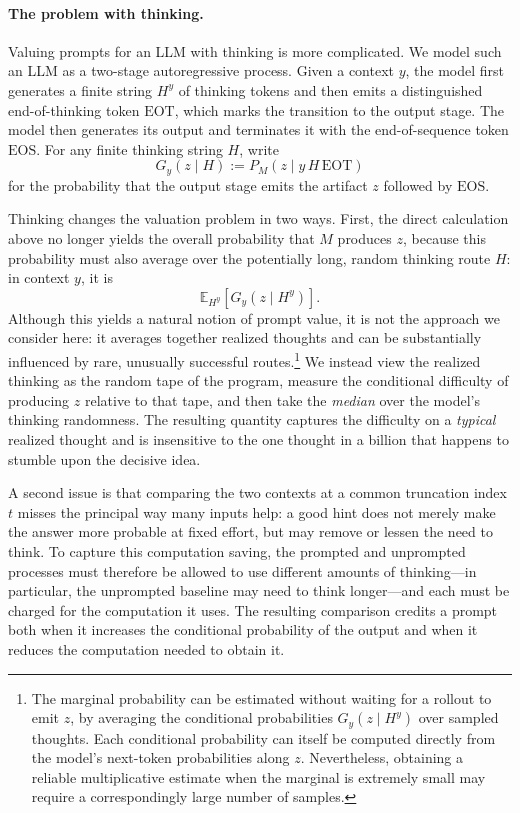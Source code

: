 \documentclass[letterpaper]{article} %
\theoremstyle{definition}
\theoremstyle{remark}
\newcommand{\EOT}{\mathrm{EOT}}
\newcommand{\E}{\mathbb{E}}
\newcommand{\EOS}{\mathrm{EOS}}
\begin{document}
\paragraph{The problem with thinking.}
Valuing prompts for an LLM with thinking is more complicated.  We model such
an LLM as a two-stage autoregressive process.  Given a context \(y\), the model
first generates a finite string \(H^y\) of thinking tokens and then emits a
distinguished end-of-thinking token \(\EOT\), which marks the transition to the
output stage.  The model then generates its output and terminates it with the
end-of-sequence token \(\EOS\). 
For any finite thinking string \(H\),
write
\[
  G_y(z\mid H)
  :=
  P_M(z\mid y\,H\,\EOT)
\]
for the probability that the output stage emits the artifact \(z\)
followed by \(\EOS\).

Thinking changes the valuation problem in two ways. First, the direct
calculation above no longer yields the overall probability that \(M\) produces
\(z\), because this probability must also average over the potentially long,
random thinking route $H$:  in context \(y\), it is
\[
  \E_{H^y}\!\left[G_y(z\mid H^y)\right].
\]
Although this yields a natural notion of prompt value, it is not the approach
we consider here: it averages together realized thoughts and can be
substantially influenced by rare, unusually successful routes.\footnote{The
marginal probability can be estimated without waiting for a rollout to emit
\(z\), by averaging the conditional probabilities
\(G_y(z\mid H^y)\) over sampled thoughts.  Each conditional probability can
itself be computed directly from the model's next-token probabilities along
\(z\).  Nevertheless, obtaining a reliable multiplicative estimate when the
marginal is extremely small may require a correspondingly large number of
samples.}
We instead view the realized thinking as the random tape of the program,
measure the conditional difficulty of producing \(z\) relative to that tape,
and then take the \emph{median} over the model's thinking randomness.  The
resulting quantity captures the difficulty on a \emph{typical} realized thought
and is insensitive to the one thought in a billion that happens to stumble
upon the decisive idea.

A second issue is that comparing the two contexts at a common truncation index $t$
misses the principal way many inputs help: a good hint does not merely make the
answer more probable at fixed effort, but may remove or lessen the need to think.
To capture this computation saving, the prompted and unprompted processes must
therefore be allowed to use different amounts of thinking---in particular, the
unprompted baseline may need to think longer---and each must be charged for the
computation it uses. The resulting comparison credits a prompt both when it
increases the conditional probability of the output and when it reduces the
computation needed to obtain it.
\end{document}
